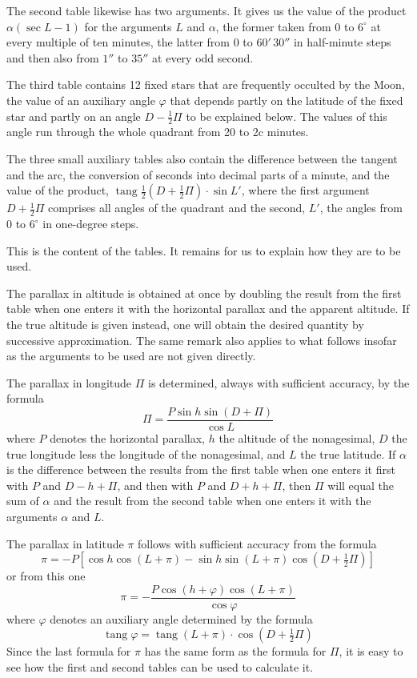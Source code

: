 The second table likewise has two arguments. It gives us the value of the product $\alpha(\sec L - 1)$ for the arguments $L$ and $\alpha$, the former taken from 0 to $6^{\circ}$ at every multiple of ten minutes, the latter from 0 to $60'\,30''$ in half-minute steps and then also from $1''$ to $35''$ at every odd second.

The third table contains 12 fixed stars that are frequently occulted by the Moon, the value of an auxiliary angle $\varphi$ that depends partly on the latitude of the fixed star and partly on an angle $D - \tfrac{1}{2}\Pi$ to be explained below. The values of this angle run through the whole quadrant from 20 to 2c minutes.

The three small auxiliary tables also contain the difference between the tangent and the arc, the conversion of seconds into decimal parts of a minute, and the value of the product, $\operatorname{tang} \tfrac{1}{2}(D+\tfrac{1}{2}\Pi)\cdot\sin L'$, where the first argument $D+\tfrac{1}{2}\Pi$ comprises all angles of the quadrant and the second, $L'$, the angles from 0 to $6^{\circ}$ in one-degree steps.

This is the content of the tables. It remains for us to explain how they are to be used.

The parallax in altitude is obtained at once by doubling the result from the first table when one enters it with the horizontal parallax and the apparent altitude. If the true altitude is given instead, one will obtain the desired quantity by successive approximation. The same remark also applies to what follows insofar as the arguments to be used are not given directly.

The parallax in longitude $\Pi$ is determined, always with sufficient accuracy, by the formula
\[
\Pi = \dfrac{P \sin h \sin(D+\Pi)}{\cos L}
\]
where $P$ denotes the horizontal parallax, $h$ the altitude of the nonagesimal, $D$ the true longitude less the longitude of the nonagesimal, and $L$ the true latitude. If $\alpha$ is the difference between the results from the first table when one enters it first with $P$ and $D-h+\Pi$, and then with $P$ and $D+h+\Pi$, then $\Pi$ will equal the sum of $\alpha$ and the result from the second table when one enters it with the arguments $\alpha$ and $L$.

The parallax in latitude $\pi$ follows with sufficient accuracy from the formula
\[
\pi = -P[\cos h \cos(L+\pi) - \sin h \sin(L+\pi)\cos(D+\tfrac{1}{2}\Pi)]
\]
or from this one
\[
\pi = -\dfrac{P\cos(h+\varphi)\cos(L+\pi)}{\cos\varphi}
\]
where $\varphi$ denotes an auxiliary angle determined by the formula
\[
\operatorname{tang} \varphi = \operatorname{tang}(L+\pi)\cdot\cos(D+\tfrac{1}{2}\Pi)
\]
Since the last formula for $\pi$ has the same form as the formula for $\Pi$, it is easy to see how the first and second tables can be used to calculate it.

